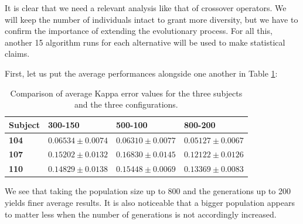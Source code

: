 	It is clear that we need a relevant analysis like that of crossover operators. We will keep the number of individuals intact to grant more diversity, but we have to confirm the importance of extending the evolutionary process. For all this, another 15 algorithm runs for each alternative will be used to make statistical claims.

	First, let us put the average performances alongside one another in Table \ref{table:popgen_kappa}:

	\vspace{0.3cm}

	\begin{table}[h]

        \centering
        \setlength\arrayrulewidth{0.8pt}

        \begin{tabular}{| >{\centering\arraybackslash}m{0.5in} | >{\centering\arraybackslash}m{1.1in} |  >{\centering\arraybackslash}m{1.1in} | >{\centering\arraybackslash}m{1.1in} |}

            \hline
            \rowcolor{RoyalBlue}
            \textbf{Subject} & \textbf{300-150} & \textbf{500-100} & \textbf{800-200} \\
            \hline
            \textbf{104} & $0.06534 \pm 0.0074$ & $0.06310 \pm 0.0077$ & $0.05127 \pm 0.0067$ \\
            \hline
            \textbf{107} & $0.15202 \pm 0.0132$ & $0.16830 \pm 0.0145$ & $0.12122 \pm 0.0126$ \\
            \hline
            \textbf{110} & $0.14829 \pm 0.0138$ & $0.15448 \pm 0.0069$ & $0.13369 \pm 0.0083$ \\
            \hline

        \end{tabular}

        \caption{Comparison of average Kappa error values for the three subjects and the three configurations.}\label{table:popgen_kappa}

    \end{table}

    We see that taking the population size up to 800 and the generations up to 200 yields finer average results. It is also noticeable that a bigger population appears to matter less when the number of generations is not accordingly increased.


